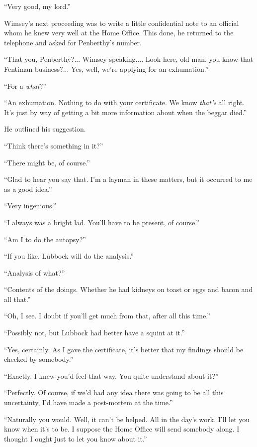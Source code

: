 \enquote{Very good, my lord.}

Wimsey's next proceeding was to write a little confidential note to an official whom he knew very well at the Home Office. This done, he returned to the telephone and asked for Penberthy's number.

\enquote{That you, Penberthy?... Wimsey speaking.... Look here, old man, you know that Fentiman business?... Yes, well, we're applying for an exhumation.}

\enquote{For a \textit{what}?}

\enquote{An exhumation. Nothing to do with your certificate. We know \textit{that's} all right. It's just by way of getting a bit more information about when the beggar died.}

He outlined his suggestion.

\enquote{Think there's something in it?}

\enquote{There might be, of course.}

\enquote{Glad to hear you say that. I'm a layman in these matters, but it occurred to me as a good idea.}

\enquote{Very ingenious.}

\enquote{I always was a bright lad. You'll have to be present, of course.}

\enquote{Am I to do the autopsy?}

\enquote{If you like. Lubbock will do the analysis.}

\enquote{Analysis of what?}

\enquote{Contents of the doings. Whether he had kidneys on toast or eggs and bacon and all that.}

\enquote{Oh, I see. I doubt if you'll get much from that, after all this time.}

\enquote{Possibly not, but Lubbock had better have a squint at it.}

\enquote{Yes, certainly. As I gave the certificate, it's better that my findings should be checked by somebody.}

\enquote{Exactly. I knew you'd feel that way. You quite understand about it?}

\enquote{Perfectly. Of course, if we'd had any idea there was going to be all this uncertainty, I'd have made a post-mortem at the time.}

\enquote{Naturally you would. Well, it can't be helped. All in the day's work. I'll let you know when it's to be. I suppose the Home Office will send somebody along. I thought I ought just to let you know about it.}

